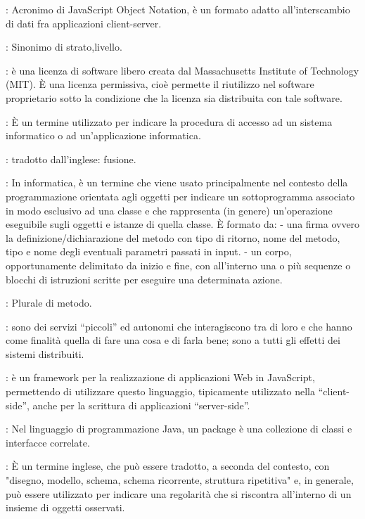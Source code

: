 {		: Acronimo di JavaScript Object Notation, è un formato adatto all'interscambio di dati fra applicazioni client-server.
	
	
		: Sinonimo di strato,livello.
		
		: è una licenza di software libero creata dal Massachusetts Institute of Technology (MIT). È una licenza permissiva, cioè permette il riutilizzo nel software proprietario sotto la condizione che la licenza sia distribuita con tale software.
		
		: È un termine utilizzato per indicare la procedura di accesso ad un sistema informatico o ad un'applicazione informatica.
	
		: tradotto dall'inglese: fusione.
		
		: In informatica, è un termine che viene usato principalmente nel contesto della programmazione orientata agli oggetti per indicare un sottoprogramma associato in modo esclusivo ad una classe e che rappresenta (in genere) un'operazione eseguibile sugli oggetti e istanze di quella classe. È formato da:
- una firma ovvero la definizione/dichiarazione del metodo con tipo di ritorno, nome del metodo, tipo e nome degli eventuali parametri passati in input.
- un corpo, opportunamente delimitato da inizio e fine, con all'interno una o più sequenze o blocchi di istruzioni scritte per eseguire una determinata azione.

		: Plurale di metodo.
		
		: sono dei servizi “piccoli” ed autonomi che interagiscono tra di loro e che hanno come finalità quella di fare una cosa e di farla bene; sono a tutti gli effetti dei sistemi distribuiti.
		
		 : è un framework per la realizzazione di applicazioni Web in JavaScript, permettendo di utilizzare questo linguaggio, tipicamente utilizzato nella “client-side”, anche per la scrittura di applicazioni “server-side”.
		

		: Nel linguaggio di programmazione Java, un package è una collezione di classi e interfacce correlate.
		
		: È un termine inglese, che può essere tradotto, a seconda del contesto, con "disegno, modello, schema, schema ricorrente, struttura ripetitiva" e, in generale, può essere utilizzato per indicare una regolarità che si riscontra all'interno di un insieme di oggetti osservati.
		
}
